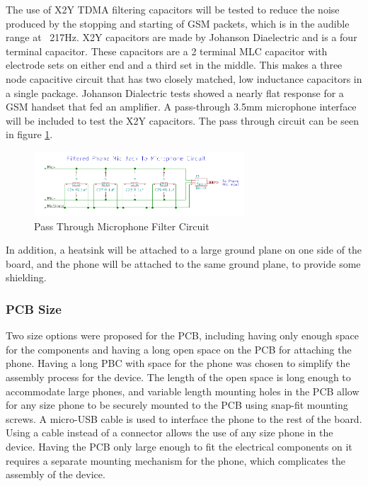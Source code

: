 \documentclass{article}
\numberwithin{figure}{section}
\numberwithin{equation}{section}
\begin{document}
{The use of X2Y TDMA filtering capacitors will be tested to reduce the noise produced by the stopping and starting of GSM packets, which is in the audible range at ~217Hz. X2Y capacitors are made by Johanson Diaelectric and is a four terminal capacitor. These capacitors are a 2 terminal MLC capacitor with electrode sets on either end and a third set in the middle. This makes a three node capacitive circuit that has two closely matched, low inductance capacitors in a single package. Johanson Dialectric tests showed a nearly flat response for a GSM handset that fed an amplifier. A pass-through 3.5mm microphone interface will be included to test the X2Y capacitors. The pass through circuit can be seen in figure \ref{fig:x2y}.

\begin{figure}[H]
	\centering
	\includegraphics[width=0.7\textwidth]{X2Yfiltercircuit}
	\caption{Pass Through Microphone Filter Circuit}
	\label{fig:x2y}
\end{figure}

In addition, a heatsink will be attached to a large ground plane on one side of the board, and the phone will be attached to the same ground plane, to provide some shielding.

\subsubsection{PCB Size}
Two size options were proposed for the PCB, including having only enough space for the components and having a long open space on the PCB for attaching the phone. Having a long PBC with space for the phone was chosen to simplify the assembly process for the device. The length of the open space is long enough to accommodate large phones, and variable length mounting holes in the PCB allow for any size phone to be securely mounted to the PCB using snap-fit mounting screws. A micro-USB cable is used to interface the phone to the rest of the board. Using a cable instead of a connector allows the use of any size phone in the device. Having the PCB only large enough to fit the electrical components on it requires a separate mounting mechanism for the phone, which complicates the assembly of the device.

}
\end{document}
